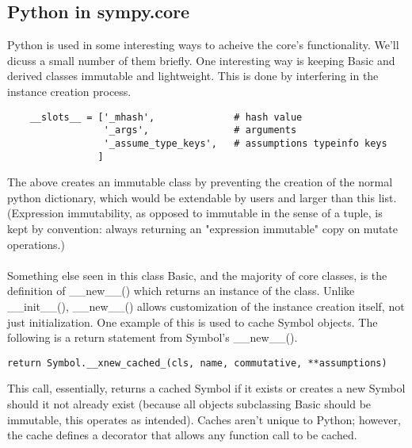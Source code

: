 \documentclass[11pt]{article}
\begin{document}
\subsection{Python in sympy.core}
Python is used in some interesting ways to acheive the core's functionality. We'll dicuss a small number of them briefly. One interesting way is keeping Basic and derived classes immutable and lightweight. This is done by interfering in the instance creation process.
\begin{verbatim}
    __slots__ = ['_mhash',              # hash value
                 '_args',               # arguments
                 '_assume_type_keys',   # assumptions typeinfo keys
                ]
\end{verbatim}
The above creates an immutable class by preventing the creation of the normal python dictionary, which would be extendable by users and larger than this list. (Expression immutability, as opposed to immutable in the sense of a tuple, is kept by convention: always returning an "expression immutable" copy on mutate operations.) \\\\
Something else seen in this class Basic, and the majority of core classes, is the definition of \_\_new\_\_() which returns an instance of the class. Unlike \_\_init\_\_(), \_\_new\_\_() allows customization of the instance creation itself, not just initialization. One example of this is used to cache Symbol objects. The following is a return statement from Symbol's \_\_new\_\_().
\begin{verbatim}
return Symbol.__xnew_cached_(cls, name, commutative, **assumptions)
\end{verbatim}
This call, essentially, returns a cached Symbol if it exists or creates a new Symbol should it not already exist (because all objects subclassing Basic should be immutable, this operates as intended). Caches aren't unique to Python; however, the cache defines a decorator that allows any function call to be cached.
\end{document}
